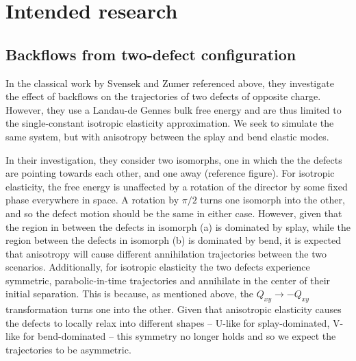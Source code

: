 \documentclass[reqno]{article}
\begin{document}
  \section{Intended research}
  \subsection{Backflows from two-defect configuration}
  In the classical work by Svensek and Zumer referenced above, they investigate
  the effect of backflows on the trajectories of two defects of opposite charge.
  However, they use a Landau-de Gennes bulk free energy and are thus limited to
  the single-constant isotropic elasticity approximation.
  We seek to simulate the same system, but with anisotropy between the splay and
  bend elastic modes.
  
  In their investigation, they consider two isomorphs, one in which the the
  defects are pointing towards each other, and one away (reference figure).
  For isotropic elasticity, the free energy is unaffected by a rotation of the
  director by some fixed phase everywhere in space.
  A rotation by $\pi / 2$ turns one isomorph into the other, and so the defect
  motion should be the same in either case.
  However, given that the region in between the defects in isomorph (a) is dominated by splay,
  while the region between the defects in isomorph (b) is dominated by bend, it
  is expected that anisotropy will cause different annihilation trajectories
  between the two scenarios.
  Additionally, for isotropic elasticity the two defects experience symmetric,
  parabolic-in-time trajectories and annihilate in the center of their initial
  separation.
  This is because, as mentioned above, the $Q_{xy} \to -Q_{xy}$ transformation
  turns one into the other.
  Given that anisotropic elasticity causes the defects to locally relax into
  different shapes -- U-like for splay-dominated, V-like for bend-dominated --
  this symmetry no longer holds and so we expect the trajectories to be
  asymmetric.
\end{document}
